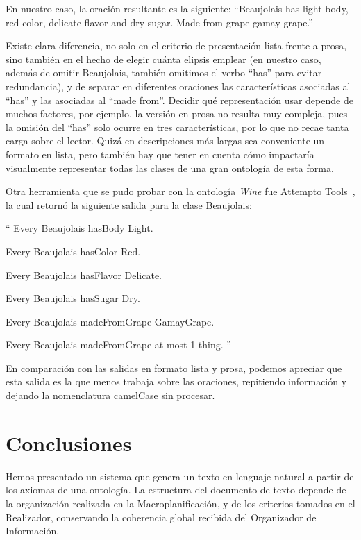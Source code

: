 En nuestro caso, la oración resultante es la siguiente:
``Beaujolais has light body, red color, delicate flavor and dry sugar. Made from grape gamay grape.''

Existe clara diferencia, no solo en el criterio de presentación lista frente a prosa, sino también en el hecho de elegir cuánta elipsis emplear (en nuestro caso, además de omitir Beaujolais, también omitimos el verbo ``has'' para evitar redundancia), y de separar en diferentes oraciones las características asociadas al ``has'' y las asociadas al ``made from''. Decidir qué representación usar depende de muchos factores, por ejemplo, la versión en prosa no resulta muy compleja, pues la omisión del ``has'' solo ocurre en tres características, por lo que no recae tanta carga sobre el lector. Quizá en descripciones más largas sea conveniente un formato en lista, pero también hay que tener en cuenta cómo impactaría visualmente representar todas las clases de una gran ontología de esta forma. %

Otra herramienta que se pudo probar con la ontología \emph{Wine} fue Attempto Tools~\cite{attempto}, la cual retornó la siguiente salida para la clase Beaujolais:

``
Every Beaujolais hasBody Light.

Every Beaujolais hasColor Red.

Every Beaujolais hasFlavor Delicate.

Every Beaujolais hasSugar Dry.

Every Beaujolais madeFromGrape GamayGrape.

Every Beaujolais madeFromGrape at most 1 thing.
''

En comparación con las salidas en formato lista y prosa, podemos apreciar que esta salida es la que menos trabaja sobre las oraciones, repitiendo información y dejando la nomenclatura camelCase sin procesar.

\section{Conclusiones}
Hemos presentado un sistema que genera un texto en lenguaje natural a partir de los axiomas de una ontología. La estructura del documento de texto depende de la organización realizada en la Macroplanificación, y de los criterios tomados en el Realizador, conservando la coherencia global recibida del Organizador de Información. 

